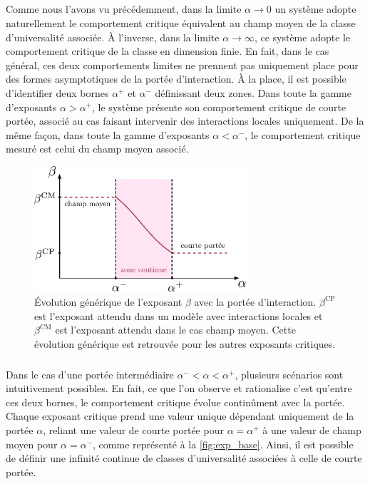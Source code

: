 \subparagraph{}Comme nous l'avons vu précédemment, dans la limite $\alpha \rightarrow 0$ un système adopte naturellement le comportement critique équivalent au champ moyen de la classe d'universalité associée. \`A l'inverse, dans la limite $\alpha \rightarrow \infty$, ce système adopte le comportement critique de la classe en dimension finie. En fait, dans le cas général, ces deux comportements limites ne prennent pas uniquement place pour des formes asymptotiques de la portée d'interaction. \`A la place, il est possible d'identifier deux bornes $\alpha^+$ et $\alpha^-$ définissant deux zones. Dans toute la gamme d'exposants $\alpha>\alpha^+$, le système présente son comportement critique de courte portée, associé au cas faisant intervenir des interactions locales uniquement. De la même façon, dans toute la gamme d'exposants $\alpha < \alpha^-$, le comportement critique mesuré est celui du champ moyen associé.

\begin{figure}[h]
	\centering
	\includegraphics[width=0.7\textwidth]{Chapitre1/Figures/LongRange/beta_base.pdf}
	\caption{Évolution générique de l'exposant $\beta$ avec la portée d'interaction. $\beta^\text{CP}$ est l'exposant attendu dans un modèle avec interactions locales et $\beta^\text{CM}$ est l'exposant attendu dans le cas champ moyen. Cette évolution générique est retrouvée pour les autres exposants critiques.}
	\label{fig:exp_base}
\end{figure}

\subparagraph{}Dans le cas d'une portée intermédiaire $\alpha^- < \alpha < \alpha^+$, plusieurs scénarios sont intuitivement possibles. En fait, ce que l'on observe et rationalise c'est qu'entre ces deux bornes, le comportement critique évolue continûment avec la portée. Chaque exposant critique prend une valeur unique dépendant uniquement de la portée $\alpha$, reliant une valeur de courte portée pour $\alpha = \alpha^+$ à une valeur de champ moyen pour $\alpha = \alpha^-$, comme représenté à la \autoref{fig:exp_base}. Ainsi, il est possible de définir une infinité continue de classes d'universalité associées à celle de courte portée.

